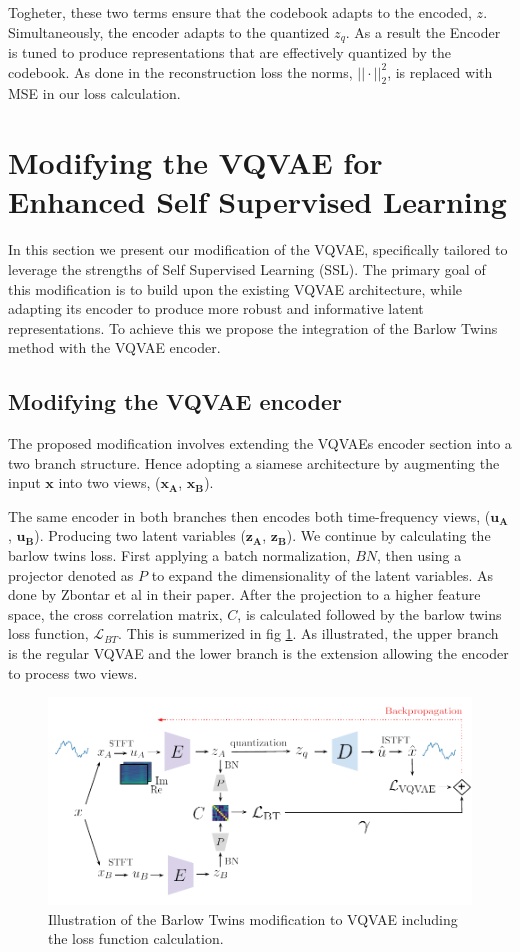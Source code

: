 Togheter, these two terms ensure that the codebook adapts to the encoded, $z$. Simultaneously, the encoder adapts to the quantized $z_q$. As a result the Encoder is tuned to produce representations that are effectively quantized by the codebook.
As done in the reconstruction loss the norms, $||\cdot||_2^2$, is replaced with MSE in our loss  calculation.
\section{Modifying the VQVAE for Enhanced Self Supervised Learning}
In this section we present our modification of the VQVAE, specifically tailored to leverage the strengths of Self Supervised Learning (SSL).
The primary goal of this modification is to build upon the existing VQVAE architecture, while adapting its encoder to produce more robust and informative latent representations.
To achieve this we propose the integration of the Barlow Twins method with the VQVAE encoder.


\subsection{Modifying the VQVAE encoder}
The proposed modification involves extending the VQVAEs encoder section into a two branch structure. Hence adopting a siamese architecture by augmenting 
the input $\mathbf{x}$ into two views, ($\mathbf{x_A}$, $\mathbf{x_B}$).

The same encoder in both branches then encodes both time-frequency views, ($\mathbf{u_A}$, $\mathbf{u_B}$). Producing two latent variables ($\mathbf{z_A}$, $\mathbf{z_B}$). We continue by calculating the barlow twins loss. First applying a batch normalization, $BN$, then using a projector denoted as $P$ to expand the dimensionality of the latent variables. As done by Zbontar et al in their paper\cite{Barlow}.
After the projection to a higher feature space, the cross correlation matrix, $C$, is calculated followed by the barlow twins loss function, $\mathcal{L}_{BT}$. This is summerized in fig \ref{fig:BTVQVAE}. 
As illustrated, the upper branch is the regular VQVAE and the lower branch is the extension allowing the encoder to process two views.

\begin{figure}[H]
    \includegraphics[scale=0.8]{figures/figure-pdf/BarlowTwinsVQVAE.pdf}
    \caption{Illustration of the Barlow Twins modification to VQVAE including the loss function calculation.}
    \label{fig:BTVQVAE}
\end{figure}

